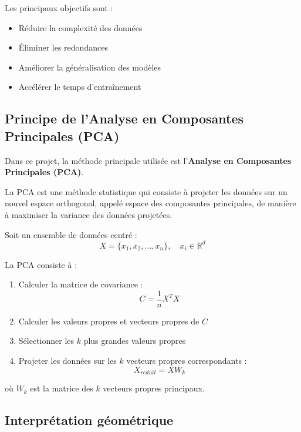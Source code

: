 \documentclass[12pt,a4paper]{article}
\begin{document}
        Les principaux objectifs sont :
        \begin{itemize}
            \item Réduire la complexité des données
            \item Éliminer les redondances
            \item Améliorer la généralisation des modèles
            \item Accélérer le temps d’entraînement
        \end{itemize}

    \subsection{Principe de l’Analyse en Composantes Principales (PCA)}

        Dans ce projet, la méthode principale utilisée est l’\textbf{Analyse en Composantes Principales (PCA)}.

        La PCA est une méthode statistique qui consiste à projeter les données sur un nouvel espace orthogonal, appelé espace des composantes principales, de manière à maximiser la variance des données projetées.

        Soit un ensemble de données centré :
        \[
        X = \{x_1, x_2, ..., x_n\}, \quad x_i \in \mathbb{R}^d
        \]

        La PCA consiste à :
        \begin{enumerate}
            \item Calculer la matrice de covariance :
            \[
            C = \frac{1}{n} X^T X
            \]

            \item Calculer les valeurs propres et vecteurs propres de \(C\)

            \item Sélectionner les \(k\) plus grandes valeurs propres

            \item Projeter les données sur les \(k\) vecteurs propres correspondants :
            \[
            X_{reduit} = X W_k
            \]
        \end{enumerate}

        où \(W_k\) est la matrice des \(k\) vecteurs propres principaux.

    \subsection{Interprétation géométrique}
\end{document}
